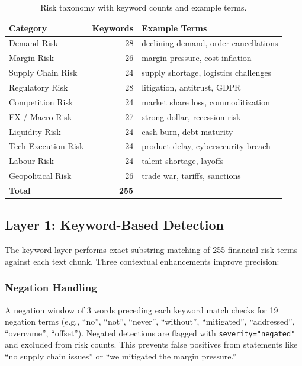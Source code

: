 \documentclass[12pt,a4paper]{article}
\begin{document}
\begin{table}[H]
\centering
\caption{Risk taxonomy with keyword counts and example terms.}
\label{tab:risk-taxonomy}
\small
\begin{tabular}{@{}lrl@{}}
\toprule
\textbf{Category} & \textbf{Keywords} & \textbf{Example Terms} \\
\midrule
Demand Risk & 28 & declining demand, order cancellations \\
Margin Risk & 26 & margin pressure, cost inflation \\
Supply Chain Risk & 24 & supply shortage, logistics challenges \\
Regulatory Risk & 28 & litigation, antitrust, GDPR \\
Competition Risk & 24 & market share loss, commoditization \\
FX / Macro Risk & 27 & strong dollar, recession risk \\
Liquidity Risk & 24 & cash burn, debt maturity \\
Tech Execution Risk & 24 & product delay, cybersecurity breach \\
Labour Risk & 24 & talent shortage, layoffs \\
Geopolitical Risk & 26 & trade war, tariffs, sanctions \\
\midrule
\textbf{Total} & \textbf{255} & \\
\bottomrule
\end{tabular}
\end{table}

\subsection{Layer 1: Keyword-Based Detection}

The keyword layer performs exact substring matching of 255 financial risk terms against each text chunk. Three contextual enhancements improve precision:

\subsubsection{Negation Handling}

A negation window of 3 words preceding each keyword match checks for 19 negation terms (e.g., ``no'', ``not'', ``never'', ``without'', ``mitigated'', ``addressed'', ``overcame'', ``offset''). Negated detections are flagged with \texttt{severity="negated"} and excluded from risk counts. This prevents false positives from statements like ``no supply chain issues'' or ``we mitigated the margin pressure.''
\end{document}
